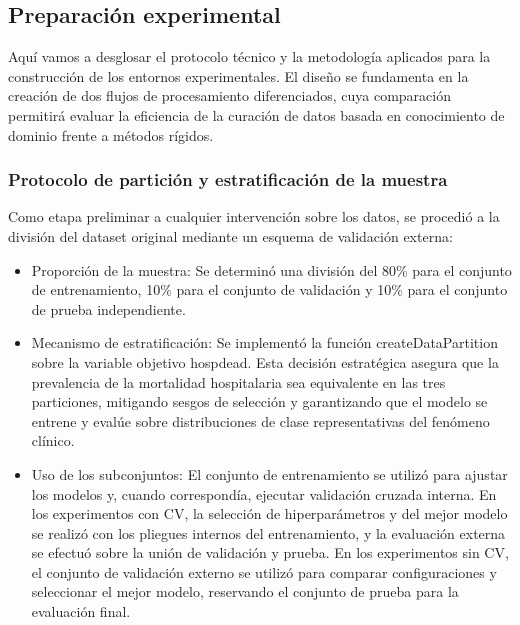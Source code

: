 \subsection{Preparación experimental}

Aquí vamos a desglosar el protocolo técnico y la metodología aplicados para la
construcción de los entornos experimentales. El diseño se fundamenta en la
creación de dos flujos de procesamiento diferenciados, cuya comparación
permitirá evaluar la eficiencia de la curación de datos basada en conocimiento
de dominio frente a métodos rígidos.

\subsubsection{Protocolo de partición y estratificación de la muestra}

Como etapa preliminar a cualquier intervención sobre los datos, se procedió a la
división del dataset original mediante un esquema de validación externa:

\begin{itemize}
  \item Proporción de la muestra: Se determinó una división del 80\% para el conjunto
    de entrenamiento, 10\% para el conjunto de validación y 10\% para el conjunto
    de prueba independiente.
  \item Mecanismo de estratificación: Se implementó la función createDataPartition
    sobre la variable objetivo hospdead. Esta decisión estratégica asegura que
    la prevalencia de la mortalidad hospitalaria sea equivalente en las tres
    particiones, mitigando sesgos de selección y garantizando que el modelo se
    entrene y evalúe sobre distribuciones de clase representativas del fenómeno
    clínico.
  \item Uso de los subconjuntos: El conjunto de entrenamiento se utilizó para
    ajustar los modelos y, cuando correspondía, ejecutar validación cruzada
    interna. En los experimentos con CV, la selección de hiperparámetros y del
    mejor modelo se realizó con los pliegues internos del entrenamiento, y la
    evaluación externa se efectuó sobre la unión de validación y prueba. En los
    experimentos sin CV, el conjunto de validación externo se utilizó para
    comparar configuraciones y seleccionar el mejor modelo, reservando el
    conjunto de prueba para la evaluación final.
\end{itemize}

